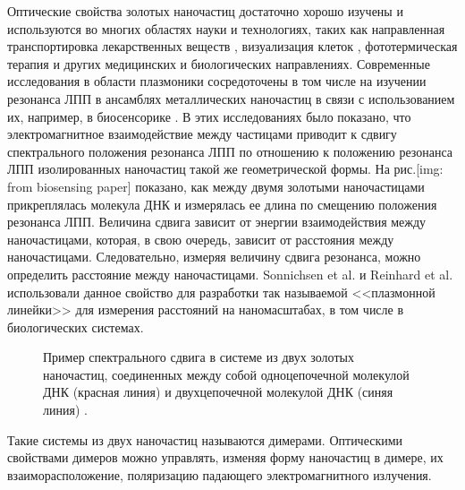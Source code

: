 Оптические свойства золотых наночастиц достаточно хорошо изучены и используются во многих областях науки и технологиях, таких как направленная транспортировка лекарственных веществ \cite{drugDelivery}, визуализация клеток \cite{cellImaging}, фототермическая терапия \cite{photothermalTherapy} и других медицинских и биологических направлениях. Современные исследования в области плазмоники сосредоточены в том числе на изучении резонанса ЛПП в ансамблях металлических наночастиц в связи с использованием их, например, в биосенсорике \cite{biosensing}. В этих исследованиях было показано, что электромагнитное взаимодействие между частицами приводит к сдвигу спектрального положения резонанса ЛПП по отношению к положению резонанса ЛПП изолированных наночастиц такой же геометрической формы. На рис.[img: from biosensing paper] показано, как между двумя золотыми наночастицами прикреплялась молекула ДНК и измерялась ее длина по смещению положения резонанса ЛПП. Величина сдвига зависит от энергии взаимодействия между наночастицами, которая, в свою очередь, зависит от расстояния между наночастицами. Следовательно, измеряя величину сдвига резонанса, можно определить расстояние между наночастицами. Sonnichsen et al. \cite{bioplasmonruler} и Reinhard et al. \cite{bioplasmonruler2} использовали данное свойство для разработки так называемой  <<плазмонной линейки>> для измерения расстояний на наномасштабах, в том числе в биологических системах.
\begin{figure}
\caption{Пример спектрального сдвига в системе из двух золотых наночастиц, соединенных между собой одноцепочечной молекулой ДНК (красная линия) и двухцепочечной молекулой ДНК (синяя линия) \cite{biosensing}.}
\label{img:PR_SEM}
\end{figure}
Такие системы из двух наночастиц называются димерами. Оптическими свойствами димеров можно управлять, изменяя форму наночастиц в димере, их взаиморасположение, поляризацию падающего электромагнитного излучения.

